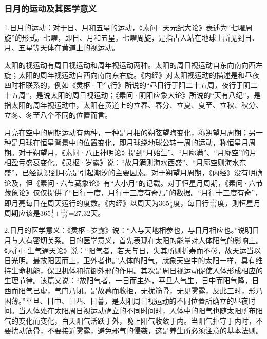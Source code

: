 \documentclass[draft,12pt]{ctexbook}
\begin{document}
\subsubsection{日月的运动及其医学意义}%

1.日月的运动：对于日、月和五星的运动，《素问·天元纪大论》表述为“七曜周旋”的形式。七曜，即日、月和五星。七曜周旋，是指古人站在地球上所见到日、月、五星等天体在黄道上的视运动。

太阳的视运动有周日视运动和周年视运动两种。太阳的周日视运动自东向南向西左旋；太阳的周年视运动自西向南向东右旋。《内经》对太阳视运动的描述是和昼夜四时相联系的，例如《灵枢·卫气行》所说的“昼日行于阳二十五周，夜行于阴二十五周”，是说太阳的周日视运动；《素问·阴阳应象大论》所说的“天有八纪”，是指太阳的周年视运动中，太阳在黄道上的立春、春分、立夏、夏至、立秋、秋分、立冬、冬至八个不同的位置而言。

月亮在空中的周期运动有两种，一种是月相的朔弦望晦变化，称朔望月周期；另一种是月球在恒星背景中的位置变化，即月球绕地球公转一周的运动，称恒星月周期。对于朔望月，《素问·八正神明论》提到“月始生”、“月廓满”、“月廓空”的月相盈亏盛衰变化。《灵枢·岁露》说：“故月满则海水西盛”、“月廓空则海水东盛”，已经认识到月亮是引起潮汐的主要因素。对于朔望月周期，《内经》没有明确论及，但《素问·六节藏象论》有“大小月”的记载。对于恒星月周期，《素问·六节藏象论》仅仅提供了“日行一度，月行十三度有奇焉”的数据。“月行十三度有奇”，即月亮每日在周天运行的度数。《内经》以周天为365$\frac{1}{4}$度，每日行$\frac{137}{19}$度，则恒星月周期应该是365$\frac{1}{4}$+$\frac{137}{19}$=27.32天。

2.日月的医学意义：《灵枢·岁露》说：“人与天地相参也，与日月相应也。”说明日月与人有密切关系。日的医学意义，首先表现在太阳的能量对人体阳气的影响上。《素问·生气通天论》说：“阳气者，若天与日，失其所则折寿而不彰，故天运当以日光明。最故阳因而上，卫外者也。”人体的阳气，就象天空中的太阳一样，具有维持生命机能，保卫机体和抗御外邪的作用。其次是周日视运动促使人体形成相应的生理节律。该篇又说：“故阳气者，一日而主外，平旦人气生，日中而阳气隆，日西而阳气已虚，气门乃闭。是故暮而收拒，无扰筋骨，无见雾露，反此三时，形乃困薄。”平旦、日中、日西、日暮，是太阳周日视运动的不同位置所确立的昼夜时间。当人体处在太阳周日视运动确立的不同时间时，人体中的阳气也随太阳所布阳气的变化而变化，白天阳气活跃于外，晚上阳气收敛于内。当阳气拒守于内时，不要扰动筋骨，不要接近雾露，避免邪气的侵袭，这是养生所必须注意的基本法则。
\end{document}
